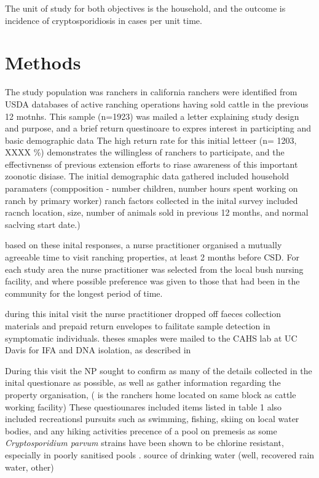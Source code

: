\documentclass[12pt]{article}
\begin{document}
	The unit of study for both objectives is the household, and the outcome is incidence of cryptosporidiosis in cases per unit time.

	\section{Methods} 
		The study population was ranchers in california 
		ranchers were identified from USDA databases of active ranching operations having sold cattle in the previous 12 motnhs. 
		This sample (n=1923) was mailed a letter explaining study design and purpose, and a brief return questinoare to expres interest in participting and basic demographic data 
		The high return rate for this initial letteer (n= 1203, XXXX \%) demonstrates the willingless of ranchers to participate, and the effectivnenss of previous extension efforts to riase awareness of this important zoonotic disiase. 
		The initial demographic data gathered included household paramaters (compposition - number children, number hours spent working on ranch by primary worker)
		ranch factors collected in the inital survey included racnch location, size, number of animals sold in previous 12 months, and normal saclving start date.)


		based on these inital responses, a nurse practitioner organised a mutually agreeable time to visit ranching properties, at least 2 months before CSD.	%
		For each study area the nurse practitioner was selected from the local bush nursing facility, and where possible preference was given to those that had been in the community for the longest period of time.

	during this inital visit the nurse practitioner dropped off faeces collection materials and prepaid return envelopes to failitate sample detection in symptomatic individuals.		%
		theses smaples were mailed to the CAHS lab at UC Davis for IFA and DNA isolation,  as described in \cite{Atwill1999}

		During this visit the NP sought to confirm as many of the details collected in the inital questionare as possible, as well as gather information regarding the property organisation, ( is the ranchers home located on same block as cattle working facility)
		These questiounares included items listed in table 1
		also included recreationsl pursuits such as swimming, fishing, skiing on local water bodies, and any hiking activities 
		precence of a pool on premesis as some \emph{Cryptosporidium parvum} strains have been shown to be chlorine resistant, especially in poorly sanitised pools \cite{Carpenter1999}.
		source of drinking water (well, recovered rain water, other)
\end{document}
